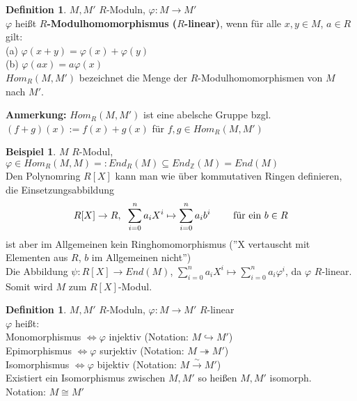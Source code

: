 \documentclass[10pt,a4paper,numbers=endperiod]{scrreprt}
\theoremstyle{definition}
\newtheorem{defi}[satz]{Definition}
\newtheorem{bsp}[satz]{Beispiel}
\def\ZZ{{\mathbb Z}}
\begin{document}
\begin{defi}
	$M, M'$ $R$-Moduln, $\varphi: M \rightarrow M'$\\
	$\varphi$ heißt \textbf{$R$-Modulhomomorphismus ($R$-linear)}, wenn für alle $x,y \in M$, $a \in R$ gilt:\\
	(a) $\varphi(x+y) = \varphi(x) + \varphi(y)$\\
	(b) $\varphi(ax) = a \varphi(x)$\\
	$Hom_R(M, M')$ bezeichnet die Menge der $R$-Modulhomomorphismen von $M$ nach $M'$.
\end{defi}

\textbf{Anmerkung:} $Hom_R(M, M')$ ist eine abelsche Gruppe bzgl. $(f+g)(x) := f(x) + g(x)$ für $f, g \in Hom_R(M, M')$

\begin{bsp}
	$M$ $R$-Modul, $\varphi \in Hom_R(M, M) =: End_R(M) \subseteq End_{\ZZ}(M) = End(M)$\\
	Den Polynomring $R[X]$ kann man wie über kommutativen Ringen definieren, die Einsetzungsabbildung
	\begin{align*}
		R[X] \rightarrow R, \hspace{2mm} \sum\limits_{i = 0}^n a_iX^i \mapsto \sum\limits_{i = 0}^n a_ib^i \hspace{7mm} \text{ für ein } b \in R
	\end{align*}
	ist aber im Allgemeinen kein Ringhomomorphismus (''X vertauscht mit Elementen aus $R$, $b$ im Allgemeinen nicht'')\\
	Die Abbildung $\psi: R[X] \rightarrow End(M)$, $\sum\limits_{i = 0}^n a_iX^i \mapsto \sum\limits_{i = 0}^n a_i \varphi^i$, da $\varphi$ $R$-linear. Somit wird $M$ zum $R[X]$-Modul.
\end{bsp}

\begin{defi}
	$M, M'$ $R$-Moduln, $\varphi: M \rightarrow M'$ $R$-linear\\
	$\varphi$ heißt:\\
	Monomorphismus $\Leftrightarrow \varphi$ injektiv (Notation: $M \hookrightarrow M'$)\\
	Epimorphismus $\Leftrightarrow \varphi$ surjektiv (Notation: $M \twoheadrightarrow M'$)\\
	Isomorphismus $\Leftrightarrow \varphi$ bijektiv (Notation: $M \overset{\sim}{\rightarrow} M'$)\\
	Existiert ein Isomorphismus zwischen $M, M'$ so heißen $M, M'$ isomorph.\\
	Notation: $M \cong M'$
\end{defi}
\end{document}
